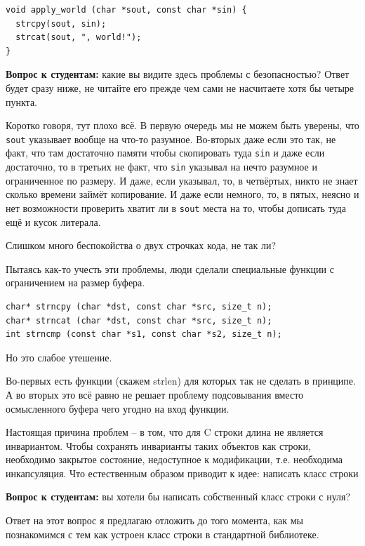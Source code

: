 \documentclass[a4paper,12pt,oneside]{article}
\begin{document}
\begin{lstlisting}
void apply_world (char *sout, const char *sin) {
  strcpy(sout, sin);
  strcat(sout, ", world!");  
}
\end{lstlisting}

\textbf{Вопрос к студентам:} какие вы видите здесь проблемы с безопасностью? Ответ будет сразу ниже, не читайте его прежде чем сами не насчитаете хотя бы четыре пункта.

Коротко говоря, тут плохо всё. В первую очередь мы не можем быть уверены, что \lstinline!sout! указывает вообще на что-то разумное. Во-вторых даже если это так, не факт, что там достаточно памяти чтобы скопировать туда \lstinline!sin! и даже если достаточно, то в третьих не факт, что \lstinline!sin! указывал на нечто разумное и ограниченное по размеру. И даже, если указывал, то, в четвёртых, никто не знает сколько времени займёт копирование. И даже если немного, то, в пятых, неясно и нет возможности проверить хватит ли в \lstinline!sout! места на то, чтобы дописать туда ещё и кусок литерала.

Слишком много беспокойства о двух строчках кода, не так ли?

Пытаясь как-то учесть эти проблемы, люди сделали специальные функции с ограничением на размер буфера.

\begin{lstlisting}
char* strncpy (char *dst, const char *src, size_t n);
char* strncat (char *dst, const char *src, size_t n);
int strncmp (const char *s1, const char *s2, size_t n);
\end{lstlisting}

Но это слабое утешение.

Во-первых есть функции (скажем strlen) для которых так не сделать в принципе. А во вторых это всё равно не решает проблему подсовывания вместо осмысленного буфера чего угодно на вход функции.

Настоящая причина проблем – в том, что для C строки длина не является инвариантом. Чтобы сохранять инварианты таких объектов как строки, необходимо закрытое состояние, недоступное к модификации, т.е. необходима инкапсуляция. Что естественным образом приводит к идее: написать класс строки

\textbf{Вопрос к студентам:} вы хотели бы написать собственный класс строки с нуля?

Ответ на этот вопрос я предлагаю отложить до того момента, как мы познакомимся с тем как устроен класс строки в стандартной библиотеке.
\end{document}
